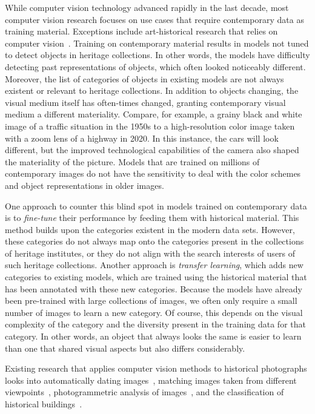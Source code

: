 \documentclass[a4paper,twoside]{article}
\begin{document}
While computer vision technology advanced rapidly in the last decade, most computer vision research focuses on use cases that require contemporary data as training material. 
Exceptions include art-historical research that relies on computer vision~\cite{madhu2019recognizing,bell2019ikonographie,offert2018images}. 
Training on contemporary material results in models not tuned to detect objects in heritage collections.
In other words, the models have difficulty detecting past representations of objects, which often looked noticeably different.
Moreover, the list of categories of objects in existing models are not always existent or relevant to heritage collections.
% 
In addition to objects changing, the visual medium itself has often-times changed, granting contemporary visual medium a different materiality. 
Compare, for example, a grainy black and white image of a traffic situation in the 1950s to a high-resolution color image taken with a zoom lens of a highway in 2020. 
In this instance, the cars will look different, but the improved technological capabilities of the camera also shaped the materiality of the picture. 
Models that are trained on millions of contemporary images do not have the sensitivity to deal with the color schemes and object representations in older images. 

One approach to counter this blind spot in models trained on contemporary data is to \textit{fine-tune} their performance by feeding them with historical
material.
This method builds upon the categories existent in the modern data sets. 
However, these categories do not always map onto the categories present in the collections of heritage institutes, or they do not align with the search interests of users of such heritage collections.
%
Another approach is \textit{transfer learning}, which adds new categories to existing models, which are trained using the historical material that has been annotated with these new categories. 
Because the models have already been pre-trained with large collections of images, we often only require a small number of images to learn a new category.  
Of course, this depends on the visual complexity of the category and the diversity present in the training data for that category. 
In other words, an object that always looks the same is easier to learn than one that shared visual aspects but also differs considerably.

Existing research that applies computer vision methods to historical photographs looks into automatically dating images~\cite{Palermo_2012}, matching images taken from different viewpoints~\cite{maiwald2019generation}, photogrammetric analysis of images~\cite{maiwald2017photogrammetric}, and the classification of historical buildings~\cite{llamasClassificationArchitecturalHeritage2017}.
\end{document}
